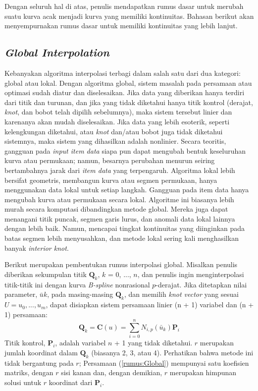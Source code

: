 Dengan seluruh hal di atas, penulis mendapatkan 
rumus dasar untuk merubah suatu kurva acak menjadi 
kurva yang memiliki kontinuitas. Bahasan berikut akan 
menyempurnakan rumus dasar untuk memiliki kontinuitas 
yang lebih lanjut.

\subsection{\emph{Global Interpolation}}

Kebanyakan algoritma interpolasi terbagi dalam 
salah satu dari dua kategori: global atau lokal. 
Dengan algoritma global, sistem masalah pada persamaan 
atau optimasi sudah diatur dan diselesaikan. Jika 
data yang diberikan hanya terdiri dari titik dan 
turunan, dan jika yang tidak diketahui hanya 
titik kontrol (derajat, \textit{knot}, dan 
bobot telah dipilih sebelumnya), maka sistem tersebut 
linier dan karenanya akan mudah diselesaikan. Jika data 
yang lebih esoterik, seperti kelengkungan diketahui, 
atau \textit{knot} dan/atau bobot juga tidak diketahui sistemnya, 
maka sistem yang dihasilkan adalah nonlinier. Secara 
teoritis, gangguan pada \textit{input item data} 
siapa pun dapat mengubah bentuk keseluruhan kurva 
atau permukaan; namun, besarnya perubahan menurun 
seiring bertambahnya jarak dari \textit{item data} 
yang terpengaruh. Algoritma lokal lebih bersifat 
geometris, membangun kurva atau segmen permukaan, 
hanya menggunakan data lokal untuk setiap langkah. 
Gangguan pada item data hanya mengubah kurva atau 
permukaan secara lokal. Algoritme ini biasanya lebih 
murah secara komputasi dibandingkan metode global. 
Mereka juga dapat menangani titik puncak, segmen garis 
lurus, dan anomali data lokal lainnya dengan lebih baik. 
Namun, mencapai tingkat kontinuitas yang diinginkan 
pada batas segmen lebih menyusahkan, dan metode lokal 
sering kali menghasilkan banyak \textit{interior knot}.

Berikut merupakan pembentukan rumus interpolasi global.
Misalkan penulis diberikan sekumpulan titik {$\textbf{Q}_k$}, 
$k$ = 0, ..., $n$, dan penulis ingin menginterpolasi 
titik-titik ini dengan kurva \textit{B-spline} 
nonrasional $p$-derajat. Jika ditetapkan nilai 
parameter, $\bar{u}k$, pada masing-masing $\textbf{Q}_k$, 
dan memilih \textit{knot vector} yang sesuai $U = {u_0, ..., u_m}$, 
dapat disiapkan sistem persamaan linier 
(n + 1) variabel dan (n + 1) persamaan:
\begin{equation}
	\textbf{Q}_k = \textbf{C}(u) = \sum_{i = 0}^{n} N_{i,p}(\bar{u}_k) \textbf{P}_i
	\label{rumus:Global}
\end{equation}
Titik kontrol, $\textbf{P}_i$, adalah variabel $n$ + 1 yang 
tidak diketahui. $r$ merupakan jumlah koordinat 
dalam $\textbf{Q}_k$ (biasanya 2, 3, atau 4). 
Perhatikan bahwa metode ini tidak bergantung pada $r$; 
Persamaan (\ref{rumus:Global}) mempunyai satu koefisien 
matriks, dengan $r$ sisi kanan dan, dengan demikian, 
$r$ merupakan himpunan solusi untuk $r$ koordinat dari $\textbf{P}_i$.

